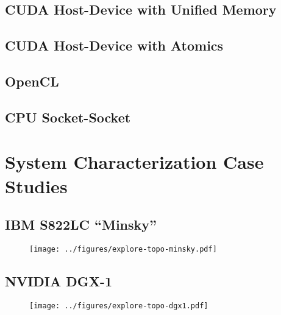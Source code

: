 \subsection{CUDA Host-Device with Unified Memory}

\subsection{CUDA Host-Device with Atomics}

\subsection{OpenCL }

\subsection{CPU Socket-Socket}

%
%
\section{System Characterization Case Studies}

\subsection{IBM S822LC ``Minsky''}
\label{sec:topology-minsky}
\begin{figure}[h]
    \centering
    \texttt{[image: ../figures/explore-topo-minsky.pdf]}
    \caption[]{}
    \label{fig:actual-perf}
\end{figure}

\subsection{NVIDIA DGX-1}
\label{sec:topology-dgx1}

\begin{figure}[h]
    \centering
    \texttt{[image: ../figures/explore-topo-dgx1.pdf]}
    \caption[]{}
    \label{fig:actual-perf}
\end{figure}
